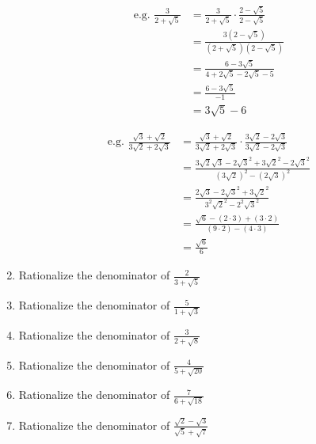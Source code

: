 \documentclass{article}
\begin{document}
\begin{enumerate}
\begin{align*}
\text{e.g. }
\frac{3}{2+\sqrt{5}}
&=\frac{3}{2+\sqrt5}\cdot\frac{2-\sqrt{5}}{2-\sqrt{5}}\\
&=\frac{3(2-\sqrt{5})}{(2+\sqrt{5})(2-\sqrt{5})}\\
&=\frac{6-3\sqrt{5}}{4+2\sqrt{5}-2\sqrt{5}-5}\\
&=\frac{6-3\sqrt{5}}{-1}\\
&=3\sqrt{5}-6
\end{align*}

\begin{align*}
\text{e.g. }
\frac{\sqrt{3}+\sqrt{2}}
{3\sqrt{2}+2\sqrt{3}}
&=\frac{\sqrt{3}+\sqrt{2}}
{3\sqrt{2}+2\sqrt{3}}\cdot
\frac{3\sqrt{2}-2\sqrt{3}}
{3\sqrt{2}-2\sqrt{3}}\\
&=\frac{3\sqrt{2}\sqrt{3}
-2{\sqrt{3}}^2
+3{\sqrt{2}}^2
-2{\sqrt{3}}^2}
{(3\sqrt{2})^2-(2\sqrt{3})^2}\\
&=\frac{2\sqrt{3}-2{\sqrt{3}}^2+3{\sqrt{2}}^2}
{3^2{\sqrt{2}}^2-2^2{\sqrt{3}}^2}\\
&=\frac{\sqrt{6}-(2\cdot3)+(3\cdot2)}{(9\cdot2)-(4\cdot3)}\\
&=\frac{\sqrt{6}}{6}
\end{align*}

\item Rationalize the denominator of $\frac{2}{3 + \sqrt{5}}$
\item Rationalize the denominator of $\frac{5}{1 + \sqrt{3}}$
\item Rationalize the denominator of $\frac{3}{2 + \sqrt{8}}$
\item Rationalize the denominator of $\frac{4}{5 + \sqrt{20}}$
\item Rationalize the denominator of $\frac{7}{6 + \sqrt{18}}$
\item Rationalize the denominator of $\frac{\sqrt{2} - \sqrt{3}}{\sqrt{5} + \sqrt{7}}$

\end{enumerate}
\end{document}
